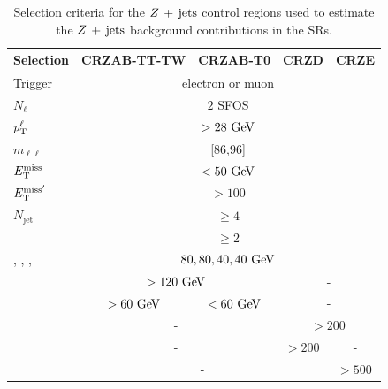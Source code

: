 		\begin{table}[htpb]
		\def\arraystretch{1.5}
		  \caption{Selection criteria for the $Z\,+\,\mathrm{jets}$ control regions used to estimate the $Z\,+\,\mathrm{jets}$ background contributions in the \acp{SR}.}
		  \begin{center}
		    \begin{tabular}{lcccc}
		      \toprule
		      \textbf{Selection}  & \textbf{CRZAB-TT-TW} & \textbf{CRZAB-T0} & \textbf{CRZD} & \textbf{CRZE}       \\
		      \toprule
			     Trigger              & \multicolumn{4}{c}{electron or muon}                                   \\ 
			     $N_{\ell}$           & \multicolumn{4}{c}{$2$ \ac{SFOS}}           \\ 
			     $p_{\mathrm{T}}^{\ell}$         & \multicolumn{4}{c}{$>28 \gev$}                                        \\ 
			     $m_{\ell\ell}$       & \multicolumn{4}{c}{[86,96] \gev}                                      \\ 
			     \midrule
			      $E_{\mathrm{T}}^{\mathrm{miss}}$              & \multicolumn{4}{c}{$<50 \gev$}                                        \\ 
			      $E_{\mathrm{T}}^{\mathrm{miss'}}$         & \multicolumn{4}{c}{$ > 100$ \gev}                                     \\
			      \midrule
			     $N_{\mathrm{jet}}$   & \multicolumn{4}{c}{$\ge 4$}                                           \\
			     \nBJet     & \multicolumn{4}{c}{$\ge 2 $}                                          \\
			      \ptzero, \ptone, \pttwo, \ptthree            & \multicolumn{4}{c}{$80,80,40,40\gev$}                              \\
			      \midrule
			       \mantikttwelvezero & \multicolumn{2}{c}{$>120\gev$} & \multicolumn{2}{c}{-}                \\ 
			       \mantikttwelveone  & $>60\gev$                      & $<60\gev$    & \multicolumn{2}{c}{-} \\ 
			       \midrule
			       \mtbminprime       & \multicolumn{2}{c}{-}          & \multicolumn{2}{c}{$>200\,$\gev}     \\
			      \mtbmaxprime        & \multicolumn{2}{c}{-}          & $>200\,$\gev & -                     \\
			      \HT                 & \multicolumn{3}{c}{-}          & $>500\,$\gev                         \\			     	\bottomrule
		    \end{tabular}
		  \end{center}
		  \label{tab:selectionCRZs}
		\end{table}		

